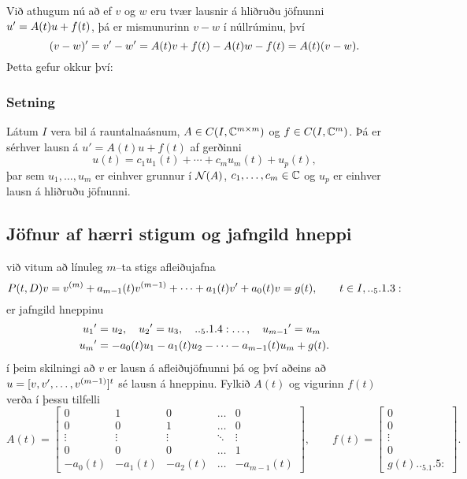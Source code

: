 Við athugum nú að ef $v$ og $w$ eru tvær lausnir á hliðruðu jöfnunni
$u{\sp{\prime}}=A(t)u+f(t)$, þá er mismunurinn $v-w$ í núllrúminu, því
 $$(v-w){\sp{\prime}}=v{\sp{\prime}}-w{\sp{\prime}}=A(t)v+f(t)-A(t)w-f(t)=A(t)(v-w).
 $$
Þetta gefur okkur því:

\subsubsection{Setning}  
Látum $I$ vera bil á rauntalnaásnum, $A\in C(I,{\mathbb C}\sp
{m\times m})$ og $f\in C(I,{\mathbb C}\sp m)$.
Þá er sérhver lausn á $u'=A(t)u+f(t)$ af gerðinni
$$ u(t)=c_1u_1(t)+\cdots+c_mu_m(t)+u_p(t),$$
þar sem $u_1,\dots,u_m$ er einhver grunnur í ${\cal N}(A)$,
$c_1,\dots,c_m\in{\mathbb C}$ og $u_p$ er einhver lausn á hliðruðu jöfnunni.


\subsection*{Jöfnur af hærri stigum  og jafngild hneppi}

við vitum að línuleg $m$--ta stigs afleiðujafna
 \begin{equation*}
P(t,D)v= v\sp{(m)}+a_{m-1}(t)v\sp{(m-1)}+\cdots+a_1(t)v\dash
+a_0(t)v=g(t), \qquad t\in I, 

.. _5.1.3:

\end{equation*} 
er jafngild hneppinu
\begin{align*}
u_1\dash &= u_2,\quad
u_2\dash = u_3,\quad

.. _5.1.4:

\dots, \quad u_{m-1}\dash = u_m\\
u_m\dash &=-a_0(t)u_1-a_1(t)u_2-\cdots-a_{m-1}(t)u_m+g(t).\nonumber
\end{align*}
í þeim skilningi að $v$ er lausn á afleiðujöfnunni þá og því aðeins að
$u=[v,v{\sp{\prime}},\dots,v^{(m-1)}]^t$ sé lausn á hneppinu.
Fylkið $A(t)$ og vigurinn $f(t)$ verða í þessu tilfelli 
\begin{equation*}A(t)=\left[\begin{matrix}
0&1&0&\dots&0\\
0&0&1&\dots&0\\
\vdots&\vdots&\vdots&\ddots&\vdots\\
0&0&0&\dots&1\\
-a_0(t)&-a_1(t)&-a_2(t)&\dots&-a_{m-1}(t)
\end{matrix}\right],
\qquad
f(t)=\left[\begin{matrix}
0\\
0\\
\vdots\\
0\\
g(t)

.. _5.1.5:

\end{matrix}\right].
\end{equation*}

